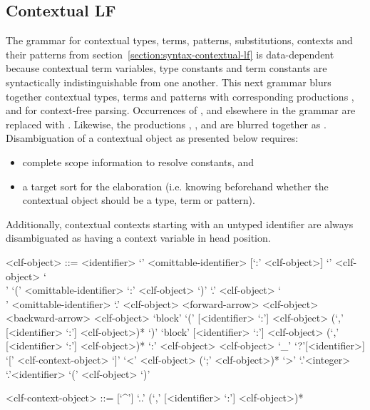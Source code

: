 \subsection{Contextual LF}

The grammar for contextual \LF types, terms, patterns, substitutions, contexts and their patterns from section~\ref{section:syntax-contextual-lf} is data-dependent because contextual \LF term variables, type constants and term constants are syntactically indistinguishable from one another.
This next grammar blurs together contextual \LF types, terms and patterns with corresponding productions ,  and  for context-free parsing.
Occurrences of ,  and  elsewhere in the grammar are replaced with .
Likewise, the productions , ,  and  are blurred together as .
Disambiguation of a contextual \LF object as presented below requires:
\begin{itemize}
\item complete scope information to resolve constants, and
\item a target sort for the elaboration (i.e. knowing beforehand whether the contextual \LF object should be a type, term or pattern).
\end{itemize}
Additionally, contextual \LF contexts starting with an untyped identifier are always disambiguated as having a context variable in head position.

\begin{grammar}
<clf-object> ::= <identifier>
\alt `{' <omittable-identifier> [`:' <clf-object>] `}' <clf-object>
\alt `\\' `(' <omittable-identifier> `:' <clf-object> `)' `.' <clf-object>
\alt `\\' <omittable-identifier> `.' <clf-object>
 <forward-arrow> <clf-object>
 <backward-arrow> <clf-object>
\alt `block' `(' [<identifier> `:'] <clf-object> (`,' [<identifier> `:'] <clf-object>)* `)'
\alt `block' [<identifier> `:'] <clf-object> (`,' [<identifier> `:'] <clf-object>)*
 `:' <clf-object>
 <clf-object>
\alt `_'
\alt `?'[<identifier>]
 `[' <clf-context-object> `]'
\alt `<' <clf-object> (`;' <clf-object>)* `>'
`.'<integer>
`.'<identifier>
\alt `(' <clf-object> `)'

<clf-context-object> ::= [`^']
\alt `..'
 (`,' [<identifier> `:'] <clf-object>)*
\end{grammar}

